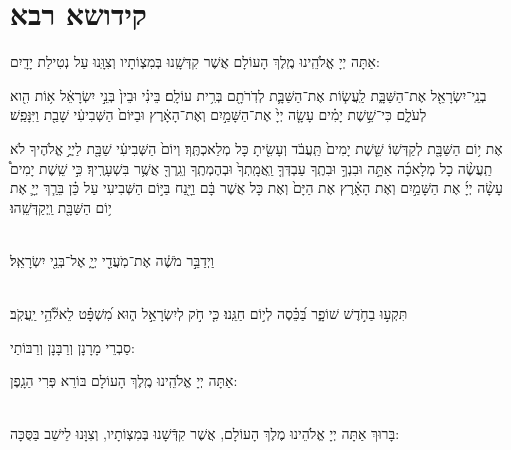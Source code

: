 \documentclass[twoside, openany, parskip=half, 11pt]{book}
\begin{document}
\vfill

\quad{}\quad{}

\chapter[קידושא רבא]{ קידושא רבא }



 אַתָּה יְיָ אֱלֹהֵֽינוּ מֶֽלֶךְ הָעוֹלָם אֲשֶׁר קִדְּשָֽׁנוּ בְּמִצְוֹתָיו וְצִוָּֽנוּ עַל נְטִילַת יָדָֽיִם: 


  בְנֵֽי־יִשְׂרָאֵ֖ל אֶת־הַשַּׁבָּ֑ת לַֽעֲשׂ֧וֹת אֶת־הַשַּׁבָּ֛ת לְדֹֽרֹתָ֖ם בְּרִ֥ית עוֹלָֽם׃ בֵּינִ֗י וּבֵין֙ בְּנֵ֣י יִשְׂרָאֵ֔ל א֥וֹת הִ֖וא לְעֹלָ֑ם כִּי־שֵׁ֣שֶׁת יָמִ֗ים עָשָׂ֤ה יְיָ֙ אֶת־הַשָּׁמַ֣יִם וְאֶת־הָאָ֔רֶץ וּבַיּוֹם֙ הַשְּׁבִיעִ֔י שָׁבַ֖ת וַיִּנָּפַֽשׁ׃


 אֶת י֥וֹם הַשַּׁבָּ֖ת לְקַדְּשֽׁוֹ׃ שֵׁ֤שֶׁת יָמִים֙ תַּֽעֲבֹ֔ד וְעָשִׂ֖יתָ כָּל מְלַאכְתֶּֽךָ׃ וְיוֹם֙ הַשְּׁבִיעִ֔י שַׁבָּ֖ת לַיֽיֳ֣ אֱלֹהֶיךָ לֹא תַֽעֲשֶׂ֨ה כָל מְלָאכָ֜ה אַתָּ֣ה וּבִנְךָ֣ וּבִתֶֽךָ עַבְדְּךָ֤ וַֽאֲמָֽתְךָ֙ וּבְהֶמְתֶֽךָ וְגֵֽרְךָ֖ אֲשֶׁ֥ר בִּשְׁעָרֶֽיךָ׃ כִּ֣י שֵֽׁשֶׁת יָמִים֩ עָשָׂ֨ה יְיָ֜ אֶת הַשָּׁמַ֣יִם וְאֶת הָאָ֗רֶץ אֶת הַיָּם֙ וְאֶת כָּל אֲשֶׁר בָּ֔ם וַיָּ֖נַח בַּיּ֣וֹם הַשְּׁבִיעִי עַל כֵּ֗ן בֵּרַ֧ךְ יְיָ֛ אֶת י֥וֹם הַשַּׁבָּ֖ת וַֽיְקַדְּשֵֽׁהוּ׃

\begin{sometimes}

\\
וַיְדַבֵּ֣ר מֹשֶׁ֔ה אֶת־מֹֽעֲדֵ֖י יְיָ֑ אֶל־בְּנֵ֖י יִשְׂרָאֵֽל׃

\sepline

\\
תִּקְע֣וּ בַחֹ֣דֶשׁ שׁוֹפָ֑ר בַּ֝כֵּ֗סֶה לְי֣וֹם חַגֵּֽנוּ׃ כִּ֤י חֹ֣ק לְיִשְׂרָאֵ֣ל ה֑וּא מִ֝שְׁפָּ֗ט לֵאלֹ֘הֵ֥י יַֽעֲקֹֽב׃

\end{sometimes}

\vspace{-.5\baselineskip}

\begin{scriptsize}
סַבְרֵי מָרָנָן וְרַבָּנָן וְרַבּוֹתַי: \\
\end{scriptsize}
 אַתָּה יְיָ אֱלֹהֵֽינוּ מֶֽלֶךְ הָעוֹלָם בּוֹרֵא פְּרִי הַגָֽפֶן:

\begin{sometimes}

\\
בָּרוּךְ אַתָּה יְיָ אֱלֹהֵינוּ מֶלֶךְ הָעוֹלָם, אֲשֶׁר קִדְּֿשָׁנוּ בְּמִצְוֹתָיו, וְצִוָּנוּ לֵישֵׁב בַּסֻּכָּה:

\end{sometimes}
\end{document}
